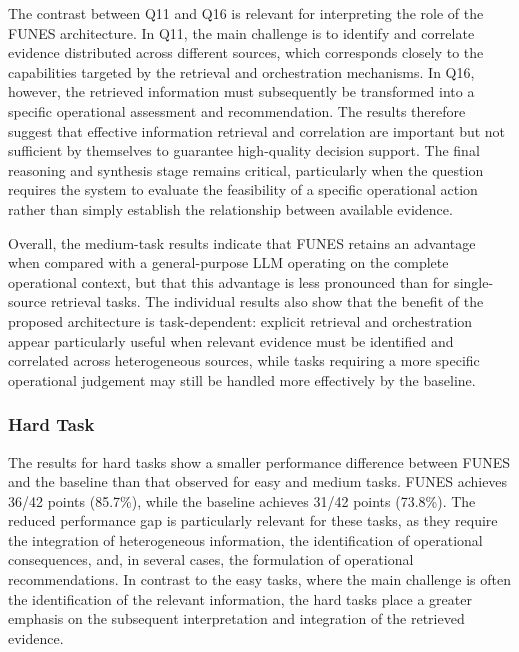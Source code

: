The contrast between Q11 and Q16 is relevant for interpreting the role of the FUNES architecture. In Q11, the main challenge is to identify and correlate evidence distributed across different sources, which corresponds closely to the capabilities targeted by the retrieval and orchestration mechanisms. In Q16, however, the retrieved information must subsequently be transformed into a specific operational assessment and recommendation. The results therefore suggest that effective information retrieval and correlation are important but not sufficient by themselves to guarantee high-quality decision support. The final reasoning and synthesis stage remains critical, particularly when the question requires the system to evaluate the feasibility of a specific operational action rather than simply establish the relationship between available evidence.

Overall, the medium-task results indicate that FUNES retains an advantage when compared with a general-purpose LLM operating on the complete operational context, but that this advantage is less pronounced than for single-source retrieval tasks. The individual results also show that the benefit of the proposed architecture is task-dependent: explicit retrieval and orchestration appear particularly useful when relevant evidence must be identified and correlated across heterogeneous sources, while tasks requiring a more specific operational judgement may still be handled more effectively by the baseline.



\subsubsection{Hard Task}
The results for hard tasks show a smaller performance difference between FUNES and the baseline than that observed for easy and medium tasks. FUNES achieves 36/42 points (85.7\%), while the baseline achieves 31/42 points (73.8\%). The reduced performance gap is particularly relevant for these tasks, as they require the integration of heterogeneous information, the identification of operational consequences, and, in several cases, the formulation of operational recommendations. In contrast to the easy tasks, where the main challenge is often the identification of the relevant information, the hard tasks place a greater emphasis on the subsequent interpretation and integration of the retrieved evidence.


